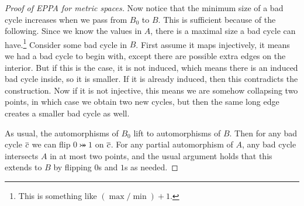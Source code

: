 \documentclass{amsart}
\begin{document}
\begin{proof}[Proof of EPPA for metric spaces]
Now notice that the minimum size of a bad cycle increases when we pass from $B_0$ to $B$. This is
sufficient because of the following. Since we know the values in $A$, there is a maximal size a bad cycle can
have.\footnote{This is something like $\left(\max / \min\right) + 1$.}
Consider some bad cycle in $B$. First assume it maps injectively, it means we had a bad
cycle to begin with, except there are possible extra edges on the interior. But if this is
the case, it is not induced, which means there is an induced bad cycle inside, so it is
smaller. If it is already induced, then this contradicts the construction.
Now if it is not injective, this means we are somehow collapsing two points, in which case
we obtain two new cycles, but then the same long edge creates a smaller bad cycle as well.

As usual, the automorphisms of $B_0$ lift to automorphisms of $B$.
Then for any bad cycle $\overline{c}$ we can flip $0\bij 1$ on $\overline{c}$.
For any partial automorphism of $A$, any bad cycle intersects $A$ in at most two
points, and the usual argument holds that this extends to $B$ by flipping $0$s and $1$s as
needed.
\end{proof}
\end{document}
